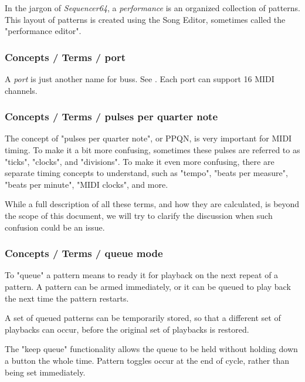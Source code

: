    In the jargon of \textsl{Sequencer64}, a
   \textsl{performance} is an organized collection of patterns.
   This layout of patterns is created using the Song Editor, sometimes
   called the "performance editor".

\subsubsection{Concepts / Terms / port}
\label{subsubsec:concepts_terms_port}

   A \textsl{port} is just another name for buss.
   See .
   Each port can support 16 MIDI channels.

\subsubsection{Concepts / Terms / pulses per quarter note}
\label{subsubsec:concepts_terms_pulses}

   The concept of "pulses per quarter note", or PPQN, is very important for
   MIDI timing.  To make it a bit more confusing, sometimes these pulses are
   referred to as "ticks", "clocks", and "divisions".
   To make it even more confusing, there are separate timing concepts to
   understand, such as "tempo", "beats per measure", "beats per minute",
   "MIDI clocks", and more.

   While a full description of all these terms, and how they are calculated, is
   beyond the scope of this document, we will try to clarify the discussion
   when such confusion could be an issue.

\subsubsection{Concepts / Terms / queue mode}
\label{subsubsec:concepts_terms_queue_mode}

   To "queue" a pattern means to ready it for playback on the next repeat of
   a pattern.  A pattern can be armed immediately, or it can be queued to
   play back the next time the pattern restarts.

   A set of queued patterns can be temporarily stored, so that a different
   set of playbacks can occur, before the original set of playbacks is
   restored.

   The "keep queue" functionality allows the queue to be held without
   holding down a button the whole time.  Pattern toggles occur at the end of
   cycle, rather than being set immediately.

